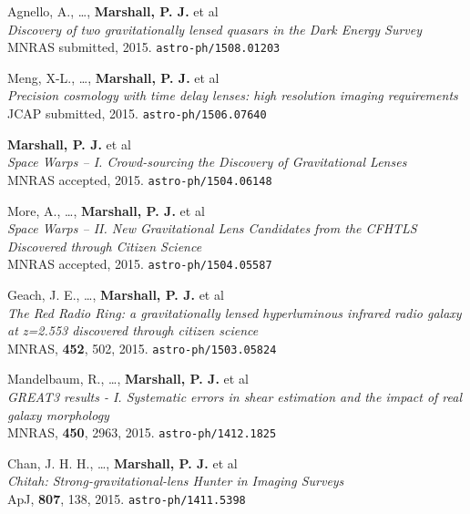 \begin{revnumerate}

  \item{Agnello, A., \dots, \textbf{Marshall, P. J.} et al\\
  \textit{Discovery of two gravitationally lensed quasars in the Dark Energy Survey}\\
  MNRAS submitted, 2015.
  \texttt{astro-ph/1508.01203}
  }

  \item{Meng, X-L., \ldots, \textbf{Marshall, P. J.} et al\\
  \textit{Precision cosmology with time delay lenses: high resolution imaging requirements}\\
  JCAP submitted, 2015.
  \texttt{astro-ph/1506.07640}
  }

  \item{\textbf{Marshall, P. J.} et al\\
  \textit{Space Warps -- I. Crowd-sourcing the Discovery of Gravitational Lenses}\\
  MNRAS accepted, 2015.
  \texttt{astro-ph/1504.06148}
  }

  \item{More, A., \ldots, \textbf{Marshall, P. J.} et al\\
  \textit{Space Warps -- II. New Gravitational Lens Candidates from the CFHTLS Discovered through Citizen Science}\\
  MNRAS accepted, 2015.
  \texttt{astro-ph/1504.05587}
  }

  \item{Geach, J. E., \ldots, \textbf{Marshall, P. J.} et al\\
  \textit{The Red Radio Ring: a gravitationally lensed hyperluminous infrared radio galaxy at z=2.553 discovered through citizen science}\\
  MNRAS, \textbf{452}, 502, 2015.
  \texttt{astro-ph/1503.05824}
  }

  \item{Mandelbaum, R., \ldots, \textbf{Marshall, P. J.} et al\\
  \textit{GREAT3 results - I. Systematic errors in shear estimation and the impact of real galaxy morphology}\\
  MNRAS, \textbf{450}, 2963, 2015.
  \texttt{astro-ph/1412.1825}
  }

  \item{Chan, J. H. H., \ldots, \textbf{Marshall, P. J.} et al\\
  \textit{Chitah: Strong-gravitational-lens Hunter in Imaging Surveys}\\
  ApJ, \textbf{807}, 138, 2015.
  \texttt{astro-ph/1411.5398}
  }


\end{revnumerate}
